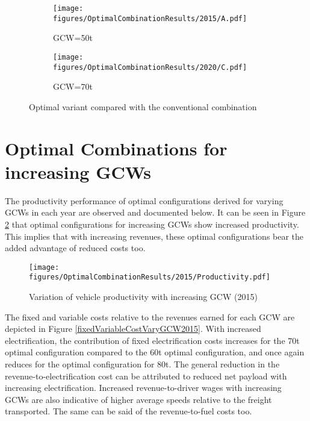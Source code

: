 \documentclass[ExampleMasters.tex]{subfiles}
\begin{document}
\begin{figure}[ht!]
\begin{subfigure}{0.5\textwidth}
\centering
\texttt{[image: figures/OptimalCombinationResults/2015/A.pdf]}
\caption{GCW=50t}
\end{subfigure}
\begin{subfigure}{.5\textwidth}
\centering
\texttt{[image: figures/OptimalCombinationResults/2020/C.pdf]}
\caption{GCW=70t}
\end{subfigure}
\caption{Optimal variant compared with the conventional combination}
\label{2015AC0vsAC1}
\end{figure}

\section{Optimal Combinations for increasing GCWs}
The productivity performance of optimal configurations derived for varying GCWs in each year are observed and documented below. It can be seen in Figure \ref{prodVaryGCW2015} that optimal configurations for increasing GCWs show increased productivity. This implies that with increasing revenues, these optimal configurations bear the added advantage of reduced costs too.\\

\begin{figure}[H]
\centering
\texttt{[image: figures/OptimalCombinationResults/2015/Productivity.pdf]}
\caption{Variation of vehicle productivity with increasing GCW (2015)}
\label{prodVaryGCW2015}
\end{figure}

The fixed and variable costs relative to the revenues earned for each GCW are depicted in Figure \ref{fixedVariableCostVaryGCW2015}. With increased electrification, the contribution of fixed electrification costs increases for the 70t optimal configuration compared to the 60t optimal configuration, and once again reduces for the optimal configuration for 80t. The general reduction in the revenue-to-electrification cost can be attributed to reduced net payload with increasing electrification. Increased revenue-to-driver wages with increasing GCWs are also indicative of higher average speeds relative to the freight transported. The same can be said of the revenue-to-fuel costs too.\\ 
\end{document}
